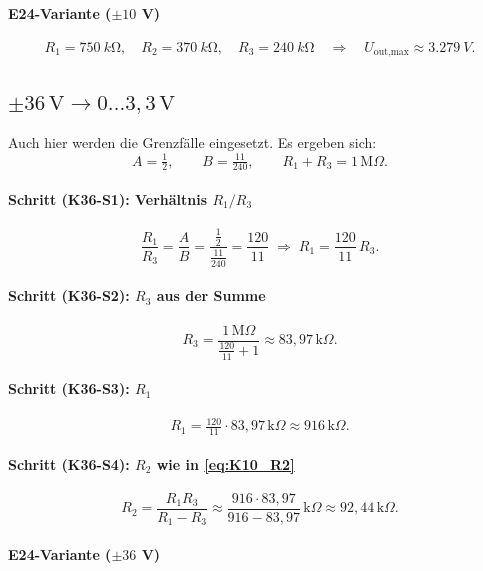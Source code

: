 \documentclass{article}
\begin{document}
	\paragraph{E24-Variante (\(\pm10\) V)}
	
	\[
	R_1=\SI{750}{k\ohm},\quad
	R_2=\SI{370}{k\ohm},\quad
	R_3=\SI{240}{k\ohm}\quad\Rightarrow\quad
	U_{\text{out,max}}\approx \SI{3.279}{V}.
	\]
	
	\subsection{\(\pm 36\,\text{V}\rightarrow 0\dots3{,}3\,\text{V}\)}
	
	Auch hier werden die Grenzfälle eingesetzt. Es ergeben sich:
	\[
	A=\tfrac{1}{2},\qquad
	B=\tfrac{11}{240},\qquad
	R_1+R_3=1\,\mathrm{M}\Omega.
	\]
	
	\paragraph{Schritt (K36-S1): Verhältnis \(R_1/R_3\)}
	
	\[
	\frac{R_1}{R_3}=\frac{A}{B}
	=\frac{\tfrac12}{\tfrac{11}{240}}
	=\frac{120}{11}
	\;\Rightarrow\;
	R_1=\frac{120}{11}\,R_3.
	\]
	
	\paragraph{Schritt (K36-S2): \(R_3\) aus der Summe}
	
	\[
	R_3=\frac{1\,\mathrm{M}\Omega}{\tfrac{120}{11}+1}
	\approx 83{,}97\,\mathrm{k}\Omega.
	\]
	
	\paragraph{Schritt (K36-S3): \(R_1\)}
	
	\[
	R_1=\tfrac{120}{11}\cdot 83{,}97\,\mathrm{k}\Omega
	\approx 916\,\mathrm{k}\Omega.
	\]
	
	\paragraph{Schritt (K36-S4): \(R_2\) wie in \eqref{eq:K10_R2}}
	
	\[
	R_2=\frac{R_1R_3}{R_1-R_3}
	\approx \frac{916\cdot 83{,}97}{916-83{,}97}\,\mathrm{k}\Omega
	\approx 92{,}44\,\mathrm{k}\Omega.
	\]
	
	\paragraph{E24-Variante (\(\pm36\) V)}
	
\end{document}
